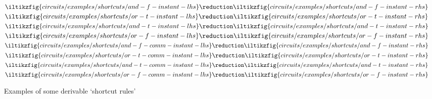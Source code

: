 \begin{figure}
    \centering
    \(
    \iltikzfig{circuits/examples/shortcuts/and-f-instant-lhs}
    \reduction
    \iltikzfig{circuits/examples/shortcuts/and-f-instant-rhs}
    \)
    \quad
    \(
    \iltikzfig{circuits/examples/shortcuts/or-t-instant-lhs}
    \reduction
    \iltikzfig{circuits/examples/shortcuts/or-t-instant-rhs}
    \)
    \quad
    \(
    \iltikzfig{circuits/examples/shortcuts/and-t-instant-lhs}
    \reduction
    \iltikzfig{circuits/examples/shortcuts/and-t-instant-rhs}
    \)
    \quad
    \(
    \iltikzfig{circuits/examples/shortcuts/or-f-instant-lhs}
    \reduction
    \iltikzfig{circuits/examples/shortcuts/or-f-instant-rhs}
    \)
    \\[1em]
    \(
    \iltikzfig{circuits/examples/shortcuts/and-f-comm-instant-lhs}
    \reduction
    \iltikzfig{circuits/examples/shortcuts/and-f-instant-rhs}
    \)
    \quad
    \(
    \iltikzfig{circuits/examples/shortcuts/or-t-comm-instant-lhs}
    \reduction
    \iltikzfig{circuits/examples/shortcuts/or-t-instant-rhs}
    \)
    \quad
    \(
    \iltikzfig{circuits/examples/shortcuts/and-t-comm-instant-lhs}
    \reduction
    \iltikzfig{circuits/examples/shortcuts/and-t-instant-rhs}
    \)
    \quad
    \(
    \iltikzfig{circuits/examples/shortcuts/or-f-comm-instant-lhs}
    \reduction
    \iltikzfig{circuits/examples/shortcuts/or-f-instant-rhs}
    \)
    \caption{Examples of some derivable `shortcut rules'}
    \label{fig:shortcuts}
\end{figure}